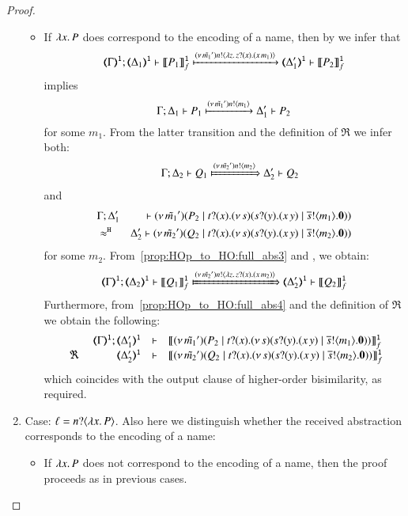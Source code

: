 \begin{proof}
\begin{enumerate}[1.]
\begin{itemize}
	\item If $\lambda x.\,P$ does correspond to the encoding of a name, then by  we infer that 
%
	\[
		\horel{\tmap{\Gamma}{1}}{\tmap{\Delta_1}{1}}{\pmapp{P_1}{1}{f}}{\hby{\news{\tilde{m_1}'} \bactout{n}{\abs{z}{\binp{z}{x} (\appl{x}{m_1})}}}}{\tmap{\Delta_1'}{1}}{\pmapp{P_2}{1}{f}}
	\]
%
	\noi implies
%
	\[
		\Gamma; \Delta_1 \vdash P_1 \xmapsto{(\nu\, \tilde{m_1}') n !\langle m_1 \rangle} \Delta_1' \vdash P_2
	\]
%
	for some $m_1$. From the latter transition and the definition of $\Re$ we infer both:
%
	\begin{eqnarray}
		&&\horel{\Gamma}{\Delta_2}{Q_1}{\Hby{\news{\tilde{m_2}'} \bactout{n}{m_2}}}{\Delta_2'}{Q_2}
		\label{prop:HOp_to_HO:full_abs3}
	\end{eqnarray}
%
	\noi and
%
	\begin{eqnarray}
		& \Gamma; \Delta_1' & \vdash (\nu\, \tilde{m_1}')(P_2 \;|\; t ? (x) . (\nu\, s)(s ? (y) . (x\, {y}) \;|\; \overline{s} ! \langle m_1 \rangle . \mathbf{0})) \nonumber \\
		& \approx^\mathtt{H} & \Delta_2' \vdash (\nu\, \tilde{m_2}')(Q_2 \;|\; t ? (x) . (\nu\, s)(s ? (y) . (x\, {y}) \;|\; \overline{s} ! \langle m_2 \rangle . \mathbf{0}))
		\label{prop:HOp_to_HO:full_abs4}
	\end{eqnarray}
%
	\noi for some $m_2$. From~\eqref{prop:HOp_to_HO:full_abs3} and , we obtain:
%
	\[
		\horel{\tmap{\Gamma}{1}}{\tmap{\Delta_2}{1}}{\pmapp{Q_1}{1}{f}}{\Hby{\news{\tilde{m_2}'} \bactout{n}{\abs{z}{\binp{z}{x} (\appl{x}{m_2})}}}}{\tmap{\Delta_2'}{1}}{\pmapp{Q_2}{1}{f}}
	\]
%
	\noi Furthermore, from~\eqref{prop:HOp_to_HO:full_abs4} and the definition of $\Re$ we obtain the following:
%
	\[
		\mhorel{\tmap{\Gamma}{1}}{\tmap{\Delta_1'}{1}}{\pmapp{\newsp{\tilde{m_1}'}{P_2 \Par \hotrigger{t}{x}{s}{m_1}}}{1}{f}}
		{\ \Re\ }{\tmap{\Delta_2'}{1}}{}{\pmapp{\newsp{\tilde{m_2}'}{Q_2 \Par \hotrigger{t}{x}{s}{m_2}}}{1}{f}}
	\]
%
	\noi which coincides with the output clause of higher-order bisimilarity, as required.
	\end{itemize}

	\item Case: $\ell = n ? \langle \lambda x.\,P \rangle$. Also here we distinguish whether the received abstraction corresponds to the encoding of a name: 

	\begin{itemize} 
	\item If $\lambda x.\,P$ does not correspond to the encoding of a name, then the proof proceeds as in previous cases.
	

\end{itemize}
\end{enumerate}
\end{proof}
